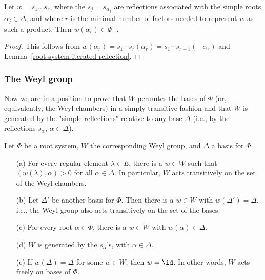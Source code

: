 \begin{corollary}\label{root system Weyl element minimal expresion prop}
Let $w=s_1\dots s_r$, where the $s_j=s_{\alpha_j}$ are reflections associated with the simple roots $\alpha_j\in\Delta$, and where $r$ is the minimal number of factors needed to represent $w$ as such a product. Then $w(\alpha_r)\in\Phi^-$.
\end{corollary}
\begin{proof}
This follows from $w(\alpha_r)=s_1\cdots s_r(\alpha_r)=s_1\cdots s_{r-1}(-\alpha_r)$ and Lemma~\ref{root system iterated reflection}.
\end{proof}
\subsubsection{The Weyl group}
Now we are in a position to prove that $W$ permutes the bases of $\Phi$ (or, equivalently, the Weyl chambers) in a simply transitive fashion and that $W$ is generated by the "simple reflections" relative to any base $\Delta$ (i.e., by the reflections $s_\alpha$, $\alpha\in\Delta$).
\begin{theorem}\label{root system Weyl group prop}
Let $\Phi$ be a root system, $W$ the corresponding Weyl group, and $\Delta$ a basis for $\Phi$.
\begin{itemize}
\item[(a)] For every regular element $\lambda\in E$, there is a $w\in W$ such that $(w(\lambda),\alpha)>0$ for all $\alpha\in\Delta$. In particular, $W$ acts transitively on the set of the Weyl chambers.
\item[(b)] Let $\Delta'$ be another basis for $\Phi$. Then there is a $w\in W$ with $w(\Delta')=\Delta$, i.e., the Weyl group also acts transitively on the set of the bases.
\item[(c)] For every root $\alpha\in\Phi$, there is a $w\in W$ with $w(\alpha)\in\Delta$.
\item[(d)] $W$ is generated by the $s_\alpha$'s, with $\alpha\in\Delta$.
\item[(e)] If $w(\Delta)=\Delta$ for some $w\in W$, then $w=\id$. In other words, $W$ acts freely on bases of $\Phi$. 
\end{itemize}
\end{theorem}
